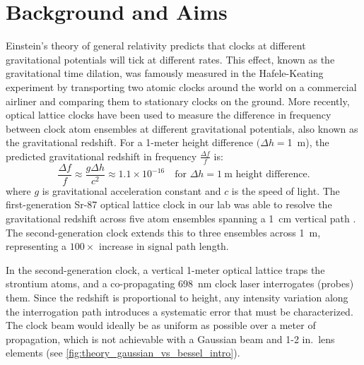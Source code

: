 \documentclass[
  aps,
  twocolumn,
  reprint,              %
  superscriptaddress,
  amsmath,
  amssymb,
  floatfix,
  longbibliography,      %
  nofootinbib %
]{revtex4-2}
\begin{document}
\section{Background and Aims}\label{sec:background}
Einstein's theory of general relativity \cite{einstein1915grundgedanken} predicts that clocks at different gravitational potentials will tick at different rates. This effect, known as the gravitational time dilation, was famously measured in the Hafele-Keating experiment \cite{hafele1972around} by transporting two atomic clocks around the world on a commercial airliner and comparing them to stationary clocks on the ground. More recently, optical lattice clocks \cite{takamoto2020test, bothwell2022resolving, zhengLabbasedTestGravitational2023} have been used to measure the difference in frequency between clock atom ensembles at different gravitational potentials, also known as the gravitational redshift. For a 1-meter height difference $(\Delta h =$\SI{1}{\meter}), the predicted gravitational redshift in frequency $\frac{\Delta f}{f}$ is:
\begin{equation}
  \dfrac{\Delta f}{f} \approx \dfrac{g \Delta h}{c^2} \approx 1.1\times10^{-16} \quad \text{for $\Delta h =\SI{1}{\meter}$ height difference.}
\end{equation}
where $g$ is gravitational acceleration constant and $c$ is the speed of light. The first-generation Sr-87 optical lattice clock in our lab was
able to resolve the gravitational
redshift across five atom ensembles spanning a
\SI{1}{\centi\meter} vertical path \cite{zhengLabbasedTestGravitational2023}. The second-generation clock extends this to three ensembles across \SI{1}{\meter}, representing a $100 \times$ increase in signal path length.

In the second-generation clock, a vertical 1-meter
optical lattice traps the strontium atoms, and a co-propagating
\SI{698}{\nano\meter} clock laser interrogates (probes) them. Since the
redshift is proportional to height, any intensity variation along the
interrogation path introduces a systematic error that must be
characterized. The clock beam would ideally be as uniform as possible over a meter of propagation, which is not achievable with a Gaussian beam and 1-2 in.\ lens elements (see \autoref{fig:theory_gaussian_vs_bessel_intro}).
\end{document}
